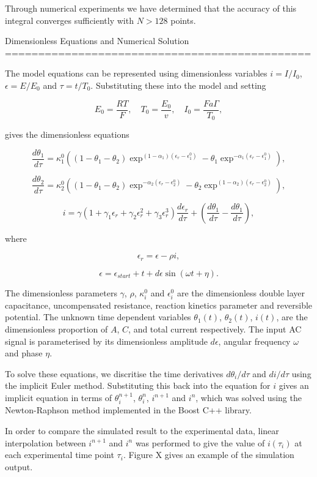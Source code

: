 \documentclass[a4paper, 12pt]{article}
\begin{document}
Through numerical experiments we have determined that the accuracy of this 
integral converges sufficiently with $N>128$ points.


Dimensionless Equations and Numerical Solution
==============================================

The model equations can be represented using dimensionless variables $i = 
I/I_0$, $\epsilon = E/E_0$ and $\tau = t/T_0$. Substituting these into the model 
and setting

$$
E_0 = \frac{RT}{F}, \quad T_0 = \frac{E_0}{v}, \quad I_0 = \frac{Fa\Gamma}{T_0},
$$

gives the dimensionless equations

$$
\frac{d\theta_1}{d\tau} = \kappa^0_1 \left( (1-\theta_1-\theta_2) 
\exp^{(1-\alpha_1) (\epsilon_r 
- \epsilon^0_1)} 
- \theta_1 \exp^{-\alpha_1(\epsilon_r - \epsilon^0_1)} \right),
$$

$$
\frac{d\theta_2}{d\tau} = \kappa^0_2 \left( (1-\theta_1-\theta_2) 
\exp^{-\alpha_2 (\epsilon_r 
- \epsilon^0_2)} 
- \theta_2 \exp^{(1-\alpha_2)(\epsilon_r - \epsilon^0_2)} \right),
$$


$$
i = \gamma \left(1 + \gamma_1 \epsilon_r + \gamma_2 \epsilon_r^2 
+ \gamma_3 \epsilon_r^3\right) \frac{d\epsilon_r}{d\tau} 
  + \left(\frac{d\theta_1}{d\tau}-\frac{d\theta_1}{d\tau}\right),
$$

where 

$$
\epsilon_r = \epsilon - \rho i,
$$

$$
\epsilon = \epsilon_{start} + t + d\epsilon \sin(\omega t + \eta).
$$

The dimensionless parameters $\gamma$, $\rho$, $\kappa^0_i$ and $\epsilon^0_i$ 
are the dimensionless double layer capacitance, uncompensated resistance, 
reaction kinetics parameter and reversible potential. The unknown time dependent 
variables $\theta_1(t)$, $\theta_2(t)$, $i(t)$, are the dimensionless proportion 
of $A$, $C$, and total current respectively. The input AC signal is 
parameterised by its dimensionless amplitude $d\epsilon$, angular frequency 
$\omega$ and phase $\eta$.

To solve these equations, we discritise the time derivatives $d\theta_i/d\tau$ 
and $di/d\tau$ using the implicit Euler method. Substituting this back into the 
equation for $i$ gives an implicit equation in terms of $\theta_i^{n+1}$, 
$\theta_i^{n}$, $i^{n+1}$ and $i^{n}$, which was solved using the Newton-Raphson 
method implemented in the Boost C++ library.

In order to compare the simulated result to the experimental data, linear 
interpolation between $i^{n+1}$ and $i^{n}$ was performed to give the value of 
$i(\tau_i)$ at each experimental time point $\tau_i$. Figure X gives an example 
of the simulation output. 
\end{document}
